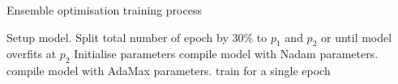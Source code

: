 \begin{algorithm}
    \caption{Ensemble optimisation training process}
        \begin{algorithmic}[1]
            \STATE Setup model. Split total number of epoch by 30\% to $p_{1}$ and $p_{2}$ or until model overfits at $p_{2}$
            \STATE Initialise parameters
                    \STATE {}
                    \STATE compile model with Nadam parameters. 
                \ELSE
                    \STATE {}
                    \STATE compile model with AdaMax parameters. 
                \ENDIF
                \STATE train for a single epoch
            \ENDWHILE
        \end{algorithmic}
    \label{alg:ENS}
\end{algorithm}

%
%
